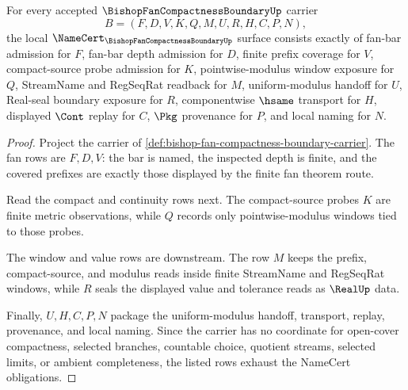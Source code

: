 \begin{theorem}
\label{thm:bishop-fan-compactness-boundary-namecert-obligations}
For every accepted $\BishopFanCompactnessBoundaryUp$ carrier
$$
B=(F,D,V,K,Q,M,U,R,H,C,P,N),
$$
the local $\NameCert_{\BishopFanCompactnessBoundaryUp}$ surface consists exactly of fan-bar admission for $F$, fan-bar depth admission for $D$, finite prefix coverage for $V$, compact-source probe admission for $K$, pointwise-modulus window exposure for $Q$, StreamName and RegSeqRat readback for $M$, uniform-modulus handoff for $U$, Real-seal boundary exposure for $R$, componentwise $\hsame$ transport for $H$, displayed $\Cont$ replay for $C$, $\Pkg$ provenance for $P$, and local naming for $N$.
\end{theorem}
\begin{proof}
Project the carrier of \autoref{def:bishop-fan-compactness-boundary-carrier}. The fan rows are $F,D,V$: the bar is named, the inspected depth is finite, and the covered prefixes are exactly those displayed by the finite fan theorem route.

Read the compact and continuity rows next. The compact-source probes $K$ are finite metric observations, while $Q$ records only pointwise-modulus windows tied to those probes.

The window and value rows are downstream. The row $M$ keeps the prefix, compact-source, and modulus reads inside finite StreamName and RegSeqRat windows, while $R$ seals the displayed value and tolerance reads as $\RealUp$ data.

Finally, $U,H,C,P,N$ package the uniform-modulus handoff, transport, replay, provenance, and local naming. Since the carrier has no coordinate for open-cover compactness, selected branches, countable choice, quotient streams, selected limits, or ambient completeness, the listed rows exhaust the NameCert obligations.
\end{proof}

